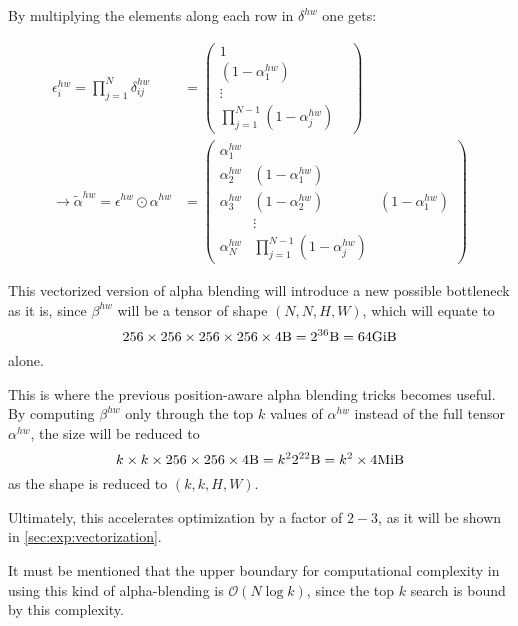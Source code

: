 By multiplying the elements along each row in $\delta^{hw}$ one gets:

\begin{align}
    \epsilon^{hw}_i = \prod^N_{j=1} \delta^{hw}_{ij} & =
    \begin{pmatrix}
        1  &\\
        (1 - \alpha^{hw}_1) &\\
        \vdots &\\
        \prod^{N-1}_{j=1} (1 - \alpha^{hw}_j)
    \end{pmatrix}
    \\ \rightarrow \tilde{\alpha}^{hw} = \epsilon^{hw} \odot \alpha^{hw} & =
    \begin{pmatrix}
        \alpha^{hw}_1 & &\\
        \alpha^{hw}_2 & (1 - \alpha^{hw}_1) &\\
        \alpha^{hw}_3 & (1 - \alpha^{hw}_2) & (1 - \alpha^{hw}_1)\\
        & \vdots &\\
        \alpha^{hw}_N & \prod^{N-1}_{j=1} (1 - \alpha^{hw}_j)
    \end{pmatrix}
\end{align}

This vectorized version of alpha blending will introduce a new possible bottleneck as it is, since $\beta^{hw}$ will be a tensor of shape $(N, N, H, W)$, which will equate to
$$
256 \times 256 \times 256 \times 256 \times 4 \si{\byte} = 2^{36}\si{\byte} = 64\si{\gibi\byte}
$$
alone.

This is where the previous position-aware alpha blending tricks becomes useful.
By computing $\beta^{hw}$ only through the top $k$ values of $\alpha^{hw}$ instead of the full tensor $\alpha^{hw}$, the size will be reduced to
$$
k \times k \times 256 \times 256 \times 4 \si{\byte} = k^2 2^{22}\si{\byte} = k^2 \times 4\si{\mebi\byte}
$$
as the shape is reduced to $(k, k, H, W)$.

Ultimately, this accelerates optimization by a factor of $2-3$, as it will be shown in \ref{sec:exp:vectorization}.

It must be mentioned that the upper boundary for computational complexity in using this kind of alpha-blending is $\mathcal{O}(N \log k)$, since the top $k$ search is bound by this complexity.
